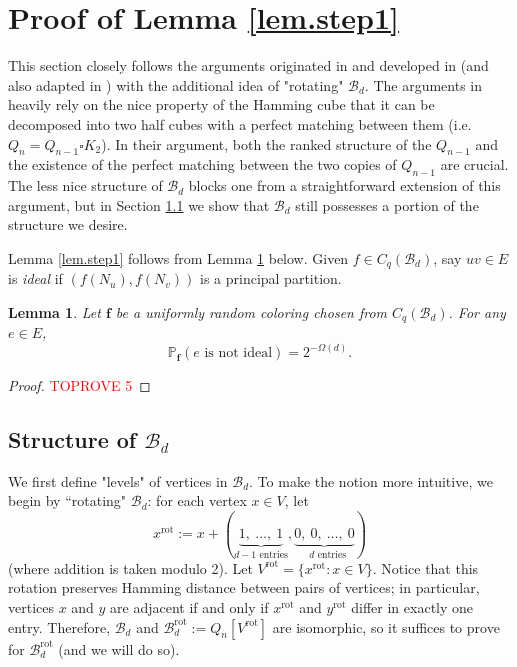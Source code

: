 \documentclass{amsart}
\newtheorem{lem}[thm]{Lemma}
\theoremstyle{definition}
\newcommand{\gO}{\Omega}
\newcommand{\cB}{\mathcal{B} }
\newcommand{\bbf}{\mathbf{f}}
\newcommand{\beq}[1]{\begin{equation}\label{#1}}
\newcommand{\enq}[0]{\end{equation}}
\newcommand{\0}[0]{\emptyset}
\newcommand{\pr}[0]{\mathbb{P}}
\newcommand{\rot}[0]{\text{rot}}
\begin{document}
\section{Proof of Lemma \ref{lem.step1}}\label{sec.step1}

This section closely follows the arguments originated in \cite{Kahn} and developed in \cite{EG} (and also adapted in \cite{JK}) with the additional idea of "rotating" $\cB_d$. The arguments in \cite{Kahn,EG} heavily rely on the nice property of the Hamming cube that it can be decomposed into two half cubes with a perfect matching between them (i.e. $Q_n=Q_{n-1} \square K_2$). In their argument, both the ranked structure of the $Q_{n-1}$ and the existence of the perfect matching between the two copies of $Q_{n-1}$ are crucial. The less nice structure of $\cB_d$ blocks one from a straightforward extension of this argument, but in Section \ref{subsec.rotation} we show that $\cB_d$ still possesses a portion of the structure we desire.
	
	Lemma \ref{lem.step1} follows from Lemma \ref{lem.step1'} below. Given $f \in C_q(\cB_d)$, say $uv \in E$ is \textit{ideal} if $(f(N_u), f(N_v))$ is a principal partition. 
	
	\begin{lem}\label{lem.step1'} 
	Let $\bbf$ be a uniformly random coloring chosen from $C_q(\cB_d)$.
	For any $e \in E$,
		\beq{eq.lem3.1}\pr_\bbf(\mbox{$e$ is not ideal})=2^{-\gO(d)}.\enq
	\end{lem}


	\begin{proof}\textcolor{red}{TOPROVE 5}\end{proof}
	


\subsection{Structure of $\cB_d$}\label{subsec.rotation}
	
	We first define "levels" of vertices in $\cB_d$. 
		To make the notion more intuitive, we begin by ``rotating" $\cB_d$: for each vertex $x\in V$, let $$x^\rot := x + (\underbrace{1,\ \dots,\  1}_{\text{$d-1$ entries}}, \underbrace{0,\ 0,\ \dots,\ 0}_{\text{ $d$ entries}})$$ 
	(where addition is taken modulo 2). Let $V^\rot=\{x^\rot:x \in V\}$. Notice that this rotation preserves Hamming distance between pairs of vertices; in particular, vertices $x$ and $y$ are adjacent if and only if $x^{\rot}$ and $y^{\rot}$ differ in exactly one entry. Therefore, $\cB_d$ and $\cB_d^\rot:=Q_n[V^\rot]$ are isomorphic, so it suffices to prove  for $\cB_d^\rot$ (and we will do so).
\end{document}
